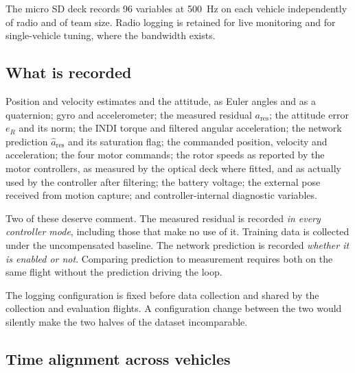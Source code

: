 The micro SD deck records \num{96} variables at \SI{500}{\hertz} on each vehicle independently of
radio and of team size. Radio logging is retained for live monitoring and for single-vehicle
tuning, where the bandwidth exists.

\subsection{What is recorded}
\label{sec:setup-recorded}

Position and velocity estimates and the attitude, as Euler angles and as a quaternion; gyro and
accelerometer; the measured residual $a_{\mathrm{res}}$; the attitude error $e_R$ and its norm; the
INDI torque and filtered angular acceleration; the network prediction $\hat{a}_{\mathrm{res}}$ and
its saturation flag; the commanded position, velocity and acceleration; the four motor commands;
the rotor speeds as reported by the motor controllers, as measured by the optical deck where
fitted, and as actually used by the controller after filtering; the battery voltage; the external
pose received from motion capture; and controller-internal diagnostic variables.

Two of these deserve comment. The measured residual is recorded \emph{in every controller mode},
including those that make no use of it. Training data is collected under the uncompensated baseline.
The network prediction is recorded \emph{whether it is enabled or not}. Comparing prediction to
measurement requires both on the same flight without the prediction driving the loop.

The logging configuration is fixed before data collection and shared by the collection and
evaluation flights. A configuration change between the two would silently make the two halves of
the dataset incomparable.

\subsection{Time alignment across vehicles}

